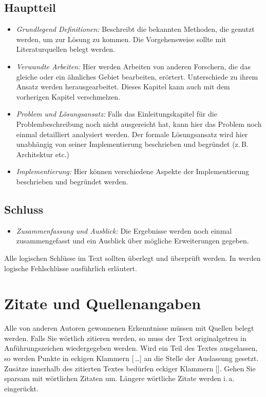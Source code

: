 \documentclass[conference,final,a4paper]{IEEEtran}
\begin{document}
\subsection{Hauptteil}
\begin{itemize}
\item \emph{Grundlegend Definitionen:} Beschreibt die bekannten Methoden, die genutzt werden, um zur Lösung zu kommen. Die Vorgehensweise sollte mit Literaturquellen belegt werden.
\item \emph{Verwandte Arbeiten:} Hier werden Arbeiten von anderen Forschern, die das gleiche oder ein ähnliches Gebiet bearbeiten, erörtert. Unterschiede zu ihrem Ansatz werden herausgearbeitet. Dieses Kapitel kann auch mit dem vorherigen Kapitel verschmelzen.
\item \emph{Problem und Lösungsansatz:} Falls das Einleitungskapitel für die Problembeschreibung noch nicht ausgereicht hat, kann hier das Problem noch einmal detailliert analysiert werden. Der formale Lösungsansatz wird hier unabhängig von seiner Implementierung beschrieben und begründet (z.\,B. Architektur etc.)
\item \emph{Implementierung:} Hier können verschiedene Aspekte der Implementierung beschrieben und begründet werden. 
\end{itemize}
\subsection{Schluss}
\begin{itemize}
\item \emph{Zusammenfassung und Ausblick:} Die Ergebnisse werden noch einmal zusammengefasst und ein Ausblick über mögliche Erweiterungen gegeben.
\end{itemize}


\noindent Alle logischen Schlüsse im Text sollten überlegt und überprüft werden. In \cite{stengel} werden logische Fehlschlüsse ausführlich erläutert.

\section{Zitate und Quellenangaben}
Alle von anderen Autoren gewonnenen Erkenntnisse müssen mit Quellen belegt werden. Falls Sie wörtlich zitieren werden, so muss der Text originalgetreu in Anführungszeichen wiedergegeben werden. Wird ein Teil des Textes ausgelassen, so werden Punkte in eckigen Klammern [\,\dots] an die Stelle der Auslassung gesetzt. Zusätze innerhalb des zitierten Textes bedürfen eckiger Klammern []. Gehen Sie sparsam mit wörtlichen Zitaten um. Längere wörtliche Zitate werden i.\,a. eingerückt.
\end{document}
